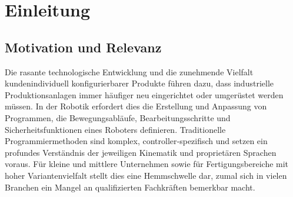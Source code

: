 

%

\chapter{Einleitung}
\label{cap:Einleitung}

\section{Motivation und Relevanz}
\label{sec:Motivation}

Die rasante technologische Entwicklung und die zunehmende Vielfalt
kundenindividuell konfigurierbarer Produkte führen dazu, dass
industrielle Produktionsanlagen immer häufiger neu eingerichtet oder
umgerüstet werden müssen. In der Robotik erfordert dies die
Erstellung und Anpassung von Programmen, die Bewegungsabläufe,
Bearbeitungsschritte und Sicherheitsfunktionen eines Roboters
definieren. Traditionelle Programmiermethoden sind komplex,
controller‑spezifisch und setzen ein profundes Verständnis der
jeweiligen Kinematik und proprietären Sprachen voraus. Für kleine und
mittlere Unternehmen sowie für Fertigungsbereiche mit hoher
Variantenvielfalt stellt dies eine Hemmschwelle dar, zumal sich in
vielen Branchen ein Mangel an qualifizierten Fachkräften bemerkbar macht.

